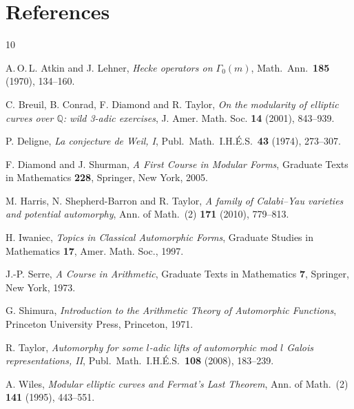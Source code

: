 \documentclass[12pt,a4paper]{amsart}
\theoremstyle{definition}
\begin{document}
\section*{References}

\begin{thebibliography}{10}

  A.\,O.\,L. Atkin and J. Lehner,
  \emph{Hecke operators on $\Gamma_0(m)$},
  Math.\ Ann.\ \textbf{185} (1970), 134--160.

  C. Breuil, B. Conrad, F. Diamond and R. Taylor,
  \emph{On the modularity of elliptic curves over $\mathbb{Q}$: wild 3-adic exercises},
  J. Amer. Math. Soc. \textbf{14} (2001), 843--939.

  P. Deligne,
  \emph{La conjecture de Weil, I},
  Publ.\ Math.\ I.H.\'E.S.\ \textbf{43} (1974), 273--307.

  F. Diamond and J. Shurman,
  \emph{A First Course in Modular Forms},
  Graduate Texts in Mathematics \textbf{228}, Springer, New York, 2005.

  M. Harris, N. Shepherd-Barron and R. Taylor,
  \emph{A family of Calabi--Yau varieties and potential automorphy},
  Ann. of Math.\ (2) \textbf{171} (2010), 779--813.

  H. Iwaniec,
  \emph{Topics in Classical Automorphic Forms},
  Graduate Studies in Mathematics \textbf{17}, Amer. Math. Soc., 1997.

  J.-P. Serre,
  \emph{A Course in Arithmetic},
  Graduate Texts in Mathematics \textbf{7}, Springer, New York, 1973.

  G. Shimura,
  \emph{Introduction to the Arithmetic Theory of Automorphic Functions},
  Princeton University Press, Princeton, 1971.

  R. Taylor,
  \emph{Automorphy for some $l$-adic lifts of automorphic mod $l$ Galois representations, II},
  Publ.\ Math.\ I.H.\'E.S.\ \textbf{108} (2008), 183--239.

  A. Wiles,
  \emph{Modular elliptic curves and Fermat's Last Theorem},
  Ann. of Math.\ (2) \textbf{141} (1995), 443--551.

\end{thebibliography}
\end{document}
